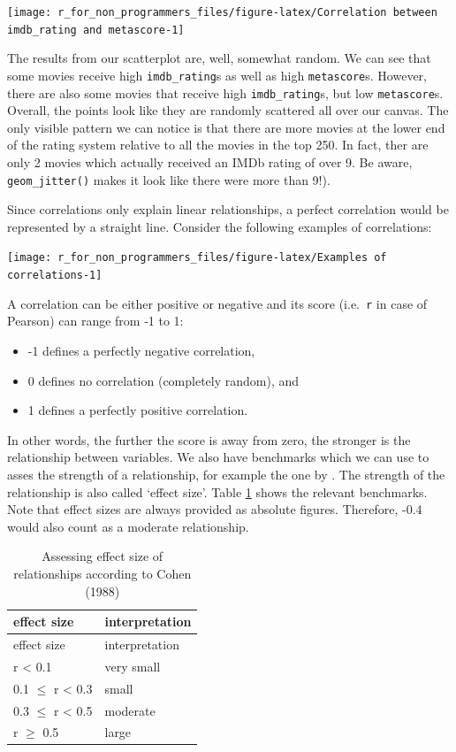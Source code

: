 \documentclass[
]{book}
\begin{document}
\begin{center}\texttt{[image: r\_for\_non\_programmers\_files/figure-latex/Correlation between imdb\_rating and metascore-1]} \end{center}

The results from our scatterplot are, well, somewhat random. We can see that some movies receive high \texttt{imdb\_rating}s as well as high \texttt{metascore}s. However, there are also some movies that receive high \texttt{imdb\_rating}s, but low \texttt{metascore}s. Overall, the points look like they are randomly scattered all over our canvas. The only visible pattern we can notice is that there are more movies at the lower end of the rating system relative to all the movies in the top 250. In fact, ther are only 2 movies which actually received an IMDb rating of over 9. Be aware, \texttt{geom\_jitter()} makes it look like there were more than 9!).

Since correlations only explain linear relationships, a perfect correlation would be represented by a straight line. Consider the following examples of correlations:

\begin{center}\texttt{[image: r\_for\_non\_programmers\_files/figure-latex/Examples of correlations-1]} \end{center}

A correlation can be either positive or negative and its score (i.e.~\texttt{r} in case of Pearson) can range from -1 to 1:

\begin{itemize}
\item
  -1 defines a perfectly negative correlation,
\item
  0 defines no correlation (completely random), and
\item
  1 defines a perfectly positive correlation.
\end{itemize}

In other words, the further the score is away from zero, the stronger is the relationship between variables. We also have benchmarks which we can use to asses the strength of a relationship, for example the one by \citet{cohen1988statistical}. The strength of the relationship is also called `effect size'. Table \ref{tab:effect-size-cohen} shows the relevant benchmarks. Note that effect sizes are always provided as absolute figures. Therefore, -0.4 would also count as a moderate relationship.

\begin{longtable}[]{@{}ll@{}}
\caption{\label{tab:effect-size-cohen} Assessing effect size of relationships according to Cohen (1988)}\tabularnewline
\toprule
effect size & interpretation \\
\midrule
\endfirsthead
\toprule
effect size & interpretation \\
\midrule
\endhead
r \textless{} 0.1 & very small \\
0.1 \(\leq\) r \textless{} 0.3 & small \\
0.3 \(\leq\) r \textless{} 0.5 & moderate \\
r \(\geq\) 0.5 & large \\
\bottomrule
\end{longtable}
\end{document}
